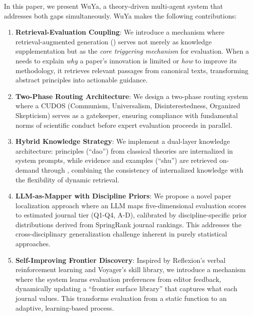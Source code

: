 In this paper, we present WuYa, a theory-driven multi-agent system that addresses both gaps simultaneously. WuYa makes the following contributions:

\begin{enumerate}
    \item \textbf{Retrieval-Evaluation Coupling}: We introduce a mechanism where retrieval-augmented generation (\rag{}) serves not merely as knowledge supplementation but as the \textit{core triggering mechanism} for evaluation. When a \subagent{} needs to explain \textit{why} a paper's innovation is limited or \textit{how} to improve its methodology, it retrieves relevant passages from canonical texts, transforming abstract principles into actionable guidance.

    \item \textbf{Two-Phase Routing Architecture}: We design a two-phase routing system where a CUDOS (Communism, Universalism, Disinterestedness, Organized Skepticism) \subagent{} serves as a gatekeeper, ensuring compliance with fundamental norms of scientific conduct before expert evaluation proceeds in parallel.

    \item \textbf{Hybrid Knowledge Strategy}: We implement a dual-layer knowledge architecture: principles (``dao'') from classical theories are internalized in system prompts, while evidence and examples (``shu'') are retrieved on-demand through \rag{}, combining the consistency of internalized knowledge with the flexibility of dynamic retrieval.

    \item \textbf{LLM-as-Mapper with Discipline Priors}: We propose a novel paper localization approach where an LLM maps five-dimensional evaluation scores to estimated journal tier (Q1-Q4, A-D), calibrated by discipline-specific prior distributions derived from SpringRank journal rankings. This addresses the cross-disciplinary generalization challenge inherent in purely statistical approaches.

    \item \textbf{Self-Improving Frontier Discovery}: Inspired by Reflexion's verbal reinforcement learning and Voyager's skill library, we introduce a mechanism where the system learns evaluation preferences from editor feedback, dynamically updating a ``frontier surface library'' that captures what each journal values. This transforms evaluation from a static function to an adaptive, learning-based process.
\end{enumerate}

